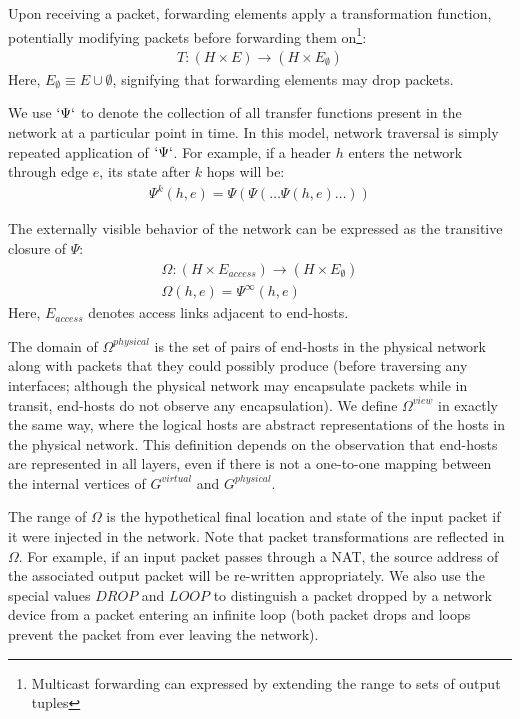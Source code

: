 Upon receiving a packet,
forwarding elements apply a transformation function, potentially modifying
packets before forwarding them on\footnote{Multicast forwarding can expressed
by extending the range to sets of output tuples}:
\begin{align*}
T: (H \times E) \rightarrow (H \times E_{\emptyset})
\end{align*}
Here, $E_{\emptyset} \equiv E \cup \emptyset$, signifying that forwarding elements
may drop packets.

We use $`\Psi`$ to denote the collection of all transfer functions present in
the network at a particular point in time. In this model, network traversal is
simply repeated application of $`\Psi`$.
For example, if a header $h$ enters the network through edge
$e$, its state after $k$ hops will be:
\begin{align*}
\Psi^k(h,e) = \Psi(\Psi(\dots \Psi(h,e)\dots))
\end{align*}

The externally visible behavior of the network can be expressed as the
transitive closure of $\Psi$:
\begin{align*}
\Omega: (H \times E_{access}) \rightarrow (H \times E_{\emptyset}) \\
\Omega(h,e) = \Psi^{\infty}(h,e)
\end{align*}
Here, $E_{access}$ denotes access links adjacent to end-hosts.

The domain of $\Omega^{physical}$ is the set of pairs of end-hosts in the
physical network along with packets that they could possibly produce (before
traversing any interfaces; although the physical network may encapsulate
packets while in transit, end-hosts do not observe any encapsulation).
We define $\Omega^{view}$ in exactly the same way, where
the logical hosts are abstract representations of the hosts in the physical
network. This definition depends on the observation that end-hosts are represented
in all layers, even if there is not a one-to-one mapping between the
internal vertices of $G^{virtual}$ and $G^{physical}$.

The range of $\Omega$ is the hypothetical final location and state of the
input packet if it were injected in the network.
Note that packet transformations are reflected in
$\Omega$. For example, if an input packet passes through a NAT,
the source address of the associated output packet will be re-written
appropriately. We also use the special values $DROP$ and $LOOP$ to distinguish
a packet dropped by a network device from a packet entering an
infinite loop (both packet drops and loops prevent the packet from ever leaving the network).

